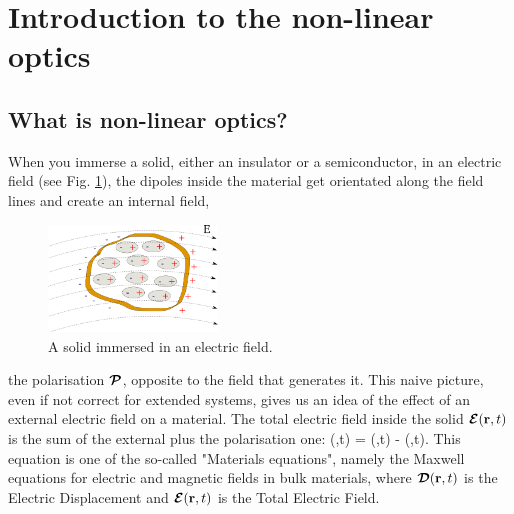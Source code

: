 
\section{Introduction to the non-linear optics} 

\subsection{What is non-linear optics?}
When you immerse a solid, either an insulator or a semiconductor, in an electric field (see Fig. \ref{immerse}), the dipoles inside the material get orientated along the field lines and create an internal field, 
\begin{figure}
  \begin{center}
    \includegraphics[width=0.4\textwidth]{Figures/immerse}
  \end{center}
  \caption{A solid immersed in an electric field. \label{immerse}}
\end{figure}
the polarisation ${\boldsymbol {\cal P}}$, opposite to the field that generates it. This naive picture, even if not correct for extended systems, gives us an idea of the effect of an external electric field on a material.
The total electric field inside the solid ${\boldsymbol {\cal E}}({\bf r},t)$ is the sum of the external plus the polarisation one:
\be
\EEc(\rr,t) = \DDc(\rr,t) - \PPc(\rr,t).
\label{materialeq}
\ee
This equation is one of the so-called  "Materials equations", namely the Maxwell equations for electric and magnetic fields in bulk materials, where ${\boldsymbol {\cal D}}({\bf r},t)$ is the Electric Displacement and $ {\boldsymbol {\cal E}}({\bf r},t)$ is the Total Electric Field. %
